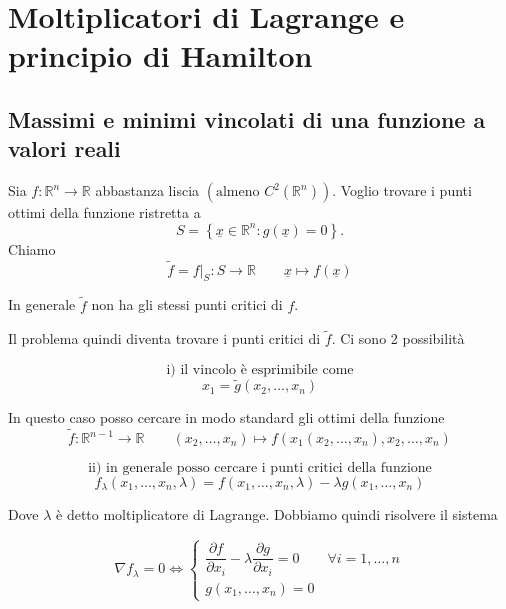 \chapter{Moltiplicatori di Lagrange e principio di Hamilton}
\section{Massimi e minimi vincolati di una funzione a valori reali}
Sia \(f:\mathbb{R}^n \to \mathbb{R}\) abbastanza liscia \(\left(\text{almeno } C^2(\mathbb{R}^n)\right)\). Voglio trovare i punti ottimi della funzione ristretta a
\[
S=\left\{\underline{x}\in\mathbb{R}^n:g(\underline{x})=0\right\}.
\]
Chiamo
\[
\widetilde{f}=f\big|_S:S\to\mathbb{R}
\qquad
\underline{x}\mapsto f(\underline{x})
\]

In generale \(\widetilde{f}\) non ha gli stessi punti critici di \(f\).

Il problema quindi diventa trovare i punti critici di \(\widetilde{f}\). Ci sono 2 possibilità

\[
\text{i) il vincolo è esprimibile come}
\]
\[
x_1=\widetilde{g}(x_2,\ldots,x_n)
\]

In questo caso posso cercare in modo standard gli ottimi della funzione
\[
\widetilde{f}:\mathbb{R}^{n-1}\to\mathbb{R}
\qquad
(x_2,\ldots,x_n)\mapsto f(x_1(x_2,\ldots,x_n),x_2,\ldots,x_n)
\]

\[
\text{ii) in generale posso cercare i punti critici della funzione}
\]
\[
f_\lambda(x_1,\ldots,x_n,\lambda)
=
f(x_1,\ldots,x_n,\lambda)
-
\lambda g(x_1,\ldots,x_n)
\]

Dove \(\lambda\) è detto moltiplicatore di Lagrange. Dobbiamo quindi risolvere il sistema

\[
\nabla f_\lambda=0
\Longleftrightarrow
\begin{cases}
\dfrac{\partial f}{\partial x_i}
-
\lambda
\dfrac{\partial g}{\partial x_i}
=0
\qquad \forall i=1,\ldots,n
\\[1em]
g(x_1,\ldots,x_n)=0
\end{cases}
\]

